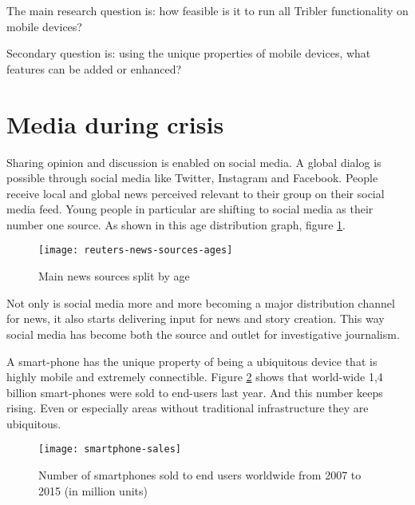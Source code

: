 The main research question is: how feasible is it to run all Tribler functionality on mobile devices? %

Secondary question is: using the unique properties of mobile devices, what features can be added or enhanced?



\section{Media during crisis}
Sharing opinion and discussion is enabled on social media.
A global dialog is possible through social media like Twitter, Instagram and Facebook.
People receive local and global news perceived relevant to their group on their social media feed.
Young people in particular are shifting to social media as their number one source. \cite{reuters_social_media}
As shown in this age distribution graph, figure \ref{fig:reuters-news-sources-ages}.
\begin{figure}
	\centering
	\texttt{[image: reuters-news-sources-ages]}
	\caption{Main news sources split by age \cite{reuters_social_media}}
	\label{fig:reuters-news-sources-ages}
\end{figure}
Not only is social media more and more becoming a major distribution channel for news, it also starts delivering input for news and story creation.
This way social media has become both the source and outlet for investigative journalism.

A smart-phone has the unique property of being a ubiquitous device that is highly mobile and extremely connectible.
Figure \ref{fig:smartphone-sales} shows that world-wide 1,4 billion smart-phones were sold to end-users last year.
And this number keeps rising.
Even or especially areas without traditional infrastructure they are ubiquitous.
\begin{figure}
	\centering
	\texttt{[image: smartphone-sales]}
	\caption{Number of smartphones sold to end users worldwide from 2007 to 2015 (in million units) \cite{smartphone-sales}}
	\label{fig:smartphone-sales}
\end{figure}

